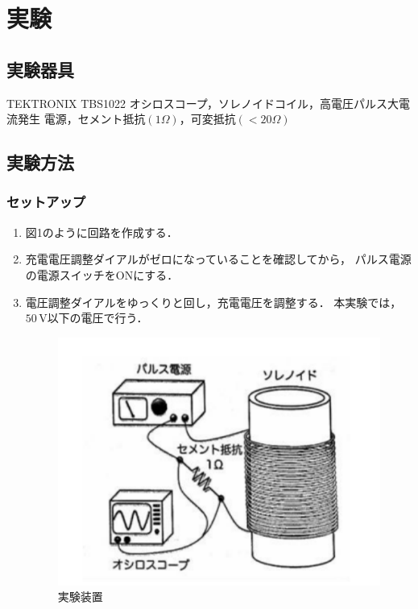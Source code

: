 
\section{実験}

\subsection{実験器具}
TEKTRONIX TBS1022 オシロスコープ，ソレノイドコイル，高電圧パルス大電流発生
電源，セメント抵抗$(1\Omega)$，可変抵抗$(<20\Omega)$

\newpage

\subsection{実験方法}
\subsubsection{セットアップ}
\begin{enumerate}
    \item 図1のように回路を作成する．
    \item 充電電圧調整ダイアルがゼロになっていることを確認してから，
    パルス電源の電源スイッチをONにする．
    \item 電圧調整ダイアルをゆっくりと回し，充電電圧を調整する．
    本実験では，$50\,\si{\volt}$以下の電圧で行う．
    \begin{figure}[H]
        \begin{center}
            \includegraphics[scale=0.75]{figure1.pdf}
            \caption{実験装置}
        \end{center}
    \end{figure}
\end{enumerate}

